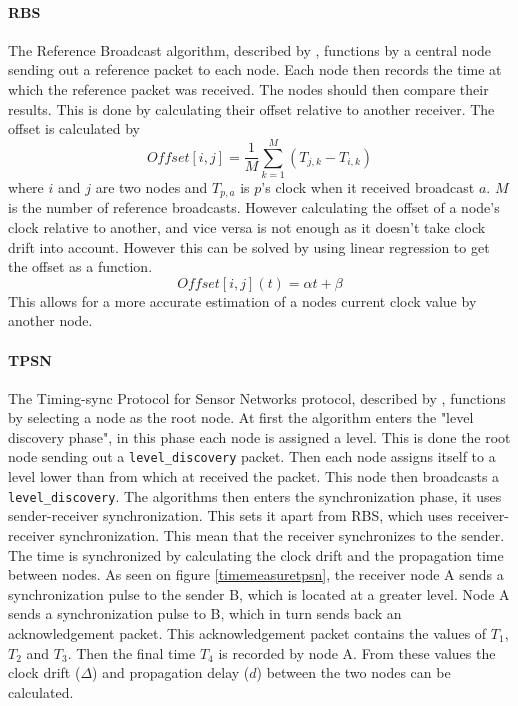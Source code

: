 \documentclass[a4paper,12pt]{article}
\begin{document}
    
    \paragraph{RBS} The Reference Broadcast algorithm, described by \cite{ElsonGirodEstrin02},  functions by a central node sending out a reference packet to each node. Each node then records the time at which the reference packet was received. %
    The nodes should then compare their results. This is done by calculating their offset relative to another receiver. The offset is calculated by 
    \begin{equation}
        \label{offsetcalc}
        \textit{Offset} [i,j] = \frac{1}{M}\sum^M_{k=1} (T_{j,k} - T_{i,k})
    \end{equation}
    where $i$ and $j$ are two nodes and $T_{p,a}$ is $p$'s clock when it received broadcast $a$. $M$ is the number of reference broadcasts.  %
    However calculating the offset of a node's clock relative to another, and vice versa is not enough as it doesn't take clock drift into account. However this can be solved by using linear regression to get the offset as a function.
    $$\textit{Offset}[i,j](t) = \alpha t + \beta$$
    This allows for a more accurate estimation of a nodes current clock value by another node.
    
    
    \paragraph{TPSN} The Timing-sync Protocol for Sensor Networks protocol, described by \cite{GaneriwalEtAl03}, functions by selecting a node as the root node. At first the algorithm enters the "level discovery phase", in this  phase each node is assigned a level. This is done the root node sending out a \texttt{level\_discovery} packet. Then each node assigns itself to a level lower than from which at received the packet. This node then broadcasts a \texttt{level\_discovery}. The algorithms then enters the synchronization phase, it uses sender-receiver synchronization. This sets it apart from RBS, which uses receiver-receiver synchronization. This mean that the receiver synchronizes to the sender. The time is synchronized by calculating the clock drift and the propagation time between nodes. As seen on figure \ref{timemeasuretpsn}, the receiver node A sends a synchronization pulse to the sender B, which is located at a greater level. Node A sends a synchronization pulse to B, which in turn sends back an acknowledgement packet. This acknowledgement packet contains the values of $T_1$, $T_2$ and $T_3$. Then the final time $T_4$ is recorded by node A. From these values the clock drift ($\Delta$) and propagation delay ($d$) between the two nodes can be calculated. 
    
\end{document}
